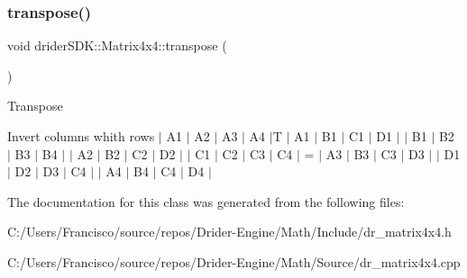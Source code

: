 \subsubsection{\texorpdfstring{transpose()}{transpose()}}
{\footnotesize\ttfamily void drider\+S\+D\+K\+::\+Matrix4x4\+::transpose (\begin{DoxyParamCaption}{ }\end{DoxyParamCaption})}

Transpose

Invert columns whith rows $\vert$ A1 $\vert$ A2 $\vert$ A3 $\vert$ A4 $\vert$T $\vert$ A1 $\vert$ B1 $\vert$ C1 $\vert$ D1 $\vert$ $\vert$ B1 $\vert$ B2 $\vert$ B3 $\vert$ B4 $\vert$ $\vert$ A2 $\vert$ B2 $\vert$ C2 $\vert$ D2 $\vert$ $\vert$ C1 $\vert$ C2 $\vert$ C3 $\vert$ C4 $\vert$ = $\vert$ A3 $\vert$ B3 $\vert$ C3 $\vert$ D3 $\vert$ $\vert$ D1 $\vert$ D2 $\vert$ D3 $\vert$ C4 $\vert$ $\vert$ A4 $\vert$ B4 $\vert$ C4 $\vert$ D4 $\vert$ 

The documentation for this class was generated from the following files\+:\begin{DoxyCompactItemize}
\item 
C\+:/\+Users/\+Francisco/source/repos/\+Drider-\/\+Engine/\+Math/\+Include/dr\+\_\+matrix4x4.\+h\item 
C\+:/\+Users/\+Francisco/source/repos/\+Drider-\/\+Engine/\+Math/\+Source/dr\+\_\+matrix4x4.\+cpp\end{DoxyCompactItemize}
